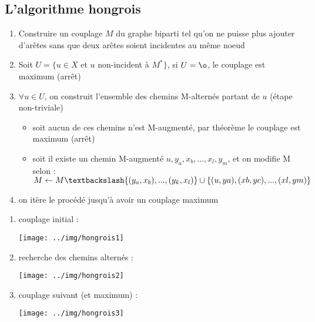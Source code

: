 \subsection{L'algorithme hongrois}
\begin{myalgo}
  \noindent
  \begin{enumerate}
    \item Construire un couplage $M$ du graphe biparti tel qu'on ne puisse plus ajouter d'arêtes sans que deux arêtes soient incidentes au même noeud
    \item Soit $U = \{u \in X$ et $u$ non-incident à $M^*\}$, si $U = \o$, le couplage est maximum (arrêt)
    \item $\forall u \in U$, on construit l'ensemble des chemins M-alternés partant de $u$ (étape non-triviale)
      \begin{itemize}
        \item soit aucun de ces chemins n'est M-augmenté, par théorème le couplage est maximum (arrêt)
        \item soit il existe un chemin M-augmenté $u,y_a,x_b,...,x_l,y_m$, et on modifie M selon :\\
        $M \leftarrow M \textbackslash\{(y_a,x_b),...,(y_k,x_l)\} \cup \{(u,ya),(xb,yc),...,(xl,ym)\}$
      \end{itemize}
    \item on itère le procédé jusqu'à avoir un couplage maximum
  \end{enumerate}
\end{myalgo}
\begin{myexem}
  \noindent
  \begin{enumerate}
    \item couplage initial :\\
      \begin{center}
        \texttt{[image: ../img/hongrois1]}
      \end{center}
    \item recherche des chemins alternés :\\
      \begin{center}
        \texttt{[image: ../img/hongrois2]}
      \end{center}
    \item couplage suivant (et maximum) :\\
      \begin{center}
        \texttt{[image: ../img/hongrois3]}
      \end{center}
  \end{enumerate}
\end{myexem}
